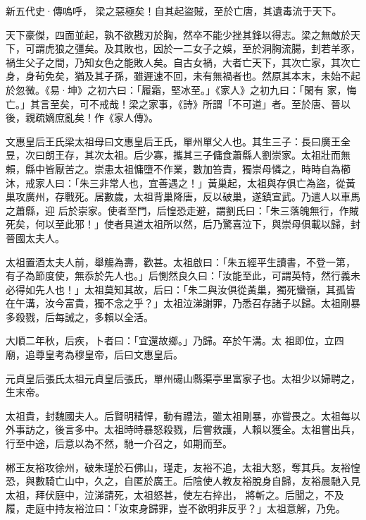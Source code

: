 
\begin{pinyinscope}

 新五代史·傳嗚呼，
 梁之惡極矣！自其起盜賊，至於亡唐，其遺毒流于天下。



 天下豪傑，四面並起，孰不欲戡刃於胸，然卒不能少挫其鋒以得志。梁之無敵於天下，可謂虎狼之彊矣。及其敗也，因於一二女子之娛，至於洞胸流腸，刲若羊豕，禍生父子之間，乃知女色之能敗人矣。自古女禍，大者亡天下，其次亡家，其次亡身，身茍免矣，猶及其子孫，雖遲速不回，未有無禍者也。然原其本末，未始不起於忽微。《易·坤》之初六曰：「履霜，堅冰至。」《家人》之初九曰：「閑有
 家，悔亡。」其言至矣，可不戒哉！梁之家事，《詩》所謂「不可道」者。至於唐、晉以後，親疏嫡庶亂矣！作《家人傳》。



 文惠皇后王氏梁太祖母曰文惠皇后王氏，單州單父人也。其生三子：長曰廣王全昱，次曰朗王存，其次太祖。后少寡，攜其三子傭食蕭縣人劉崇家。太祖壯而無賴，縣中皆厭苦之。崇患太祖慵墮不作業，數加笞責，獨崇母憐之，時時自為櫛沐，戒家人曰：「朱三非常人也，宜善遇之！」黃巢起，太祖與存俱亡為盜，從黃巢攻廣州，存戰死。居數歲，太祖背巢降唐，反以破巢，遂鎮宣武。乃遣人以車馬之蕭縣，迎
 后於崇家。使者至門，后惶恐走避，謂劉氏曰：「朱三落魄無行，作賊死矣，何以至此邪！」使者具道太祖所以然，后乃驚喜泣下，與崇母俱載以歸，封晉國太夫人。



 太祖置酒太夫人前，舉觴為壽，歡甚。太祖啟曰：「朱五經平生讀書，不登一第，有子為節度使，無忝於先人也。」后惻然良久曰：「汝能至此，可謂英特，然行義未必得如先人也！」太祖莫知其故，后曰：「朱二與汝俱從黃巢，獨死蠻嶺，其孤皆在午溝，汝今富貴，獨不念之乎？」太祖泣涕謝罪，乃悉召存諸子以歸。太祖剛暴多殺戮，后每誡之，多賴以全活。



 大順二年秋，后疾，卜者曰：「宜還故鄉。」乃歸。卒於午溝。太
 祖即位，立四廟，追尊皇考為穆皇帝，后曰文惠皇后。



 元貞皇后張氏太祖元貞皇后張氏，單州碭山縣渠亭里富家子也。太祖少以婦聘之，生末帝。



 太祖貴，封魏國夫人。后賢明精悍，動有禮法，雖太祖剛暴，亦嘗畏之。太祖每以外事訪之，後言多中。太祖時時暴怒殺戮，后嘗救護，人賴以獲全。太祖嘗出兵，行至中途，后意以為不然，馳一介召之，如期而至。



 郴王友裕攻徐州，破朱瑾於石佛山，瑾走，友裕不追，太祖大怒，奪其兵。友裕惶恐，與數騎亡山中，久之，自匿於廣王。后陰使人教友裕脫身自歸，友裕晨馳入見太祖，拜伏庭中，泣涕請死，太祖怒甚，使左右捽出，
 將斬之。后聞之，不及履，走庭中持友裕泣曰：「汝束身歸罪，豈不欲明非反乎？」太祖意解，乃免。




\end{pinyinscope}
